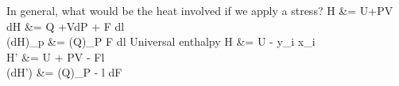 \documentclass[12pt]{article}
\begin{document}
In general, what would be the heat involved if we apply a stress?
\eqs
H &= U+PV\\
dH &= \partial Q +VdP + F dl\\
(dH)_p &= (\partial Q)_P F dl
\eqe
Universal enthalpy
\eqs
H &= U - \sum y_i x_i\\
H' &= U + PV - Fl\\
(dH') &= (\partial Q)_P - l dF
\eqe
%
\end{document}
